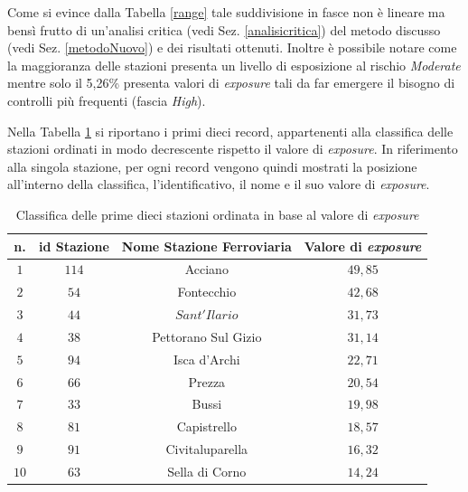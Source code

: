 Come si evince dalla Tabella \ref{range} tale suddivisione in fasce non è lineare ma bensì frutto di un'analisi critica (vedi Sez.  \ref{analisicritica}) del metodo discusso (vedi Sez. \ref{metodoNuovo}) e dei risultati ottenuti. Inoltre è possibile notare come la maggioranza delle stazioni presenta un livello di esposizione al rischio \textit{Moderate} mentre solo il 5,26\% presenta valori di \textit{exposure} tali da far emergere il bisogno di controlli più frequenti (fascia \textit{High}).

Nella Tabella \ref{classifica} si riportano i primi dieci record, appartenenti alla classifica delle stazioni ordinati in modo decrescente rispetto il valore di \textit{exposure}. In riferimento alla singola stazione, per ogni record vengono quindi mostrati la posizione all'interno della classifica, l'identificativo, il nome e il suo valore di \textit{exposure}.

\begin{table}[h]
\centering
\begin{tabular}{|c|c|c|c|}
\hline
\rowcolor{lightgray}
\textbf{n.} & \textbf{id Stazione} & \textbf{Nome Stazione Ferroviaria} & \textbf{Valore di \textit{exposure}} \\
\hline
\rowcolor{flamingopink}
$1$ & $114$ & Acciano & $49,85$ \\
\hline
\rowcolor{flamingopink}
$2$ & $54$ & Fontecchio & $42,68$ \\
\hline
\rowcolor{flamingopink}
$3$ & $44$ & $Sant'Ilario$ & $31,73$ \\
\hline
\rowcolor{flamingopink}
$4$ & $38$ & Pettorano Sul Gizio & $31,14$ \\
\hline
\rowcolor{flamingopink}
$5$ & $94$ & Isca d'Archi & $22,71$ \\
\hline
\rowcolor{flamingopink}
$6$ & $66$ & Prezza & $20,54$ \\
\hline
\rowcolor{icterine}
$7$ & $33$ & Bussi & $19,98$ \\
\hline
\rowcolor{icterine}
$8$ & $81$ & Capistrello & $18,57$ \\
\hline
\rowcolor{icterine}
$9$ & $91$ & Civitaluparella & $16,32$ \\
\hline
\rowcolor{icterine}
$10$ & $63$ & Sella di Corno & $14,24$ \\
\hline
\end{tabular}
\caption{Classifica delle prime dieci stazioni ordinata in base al valore di \textit{exposure}}
\label{classifica}
\end{table}
